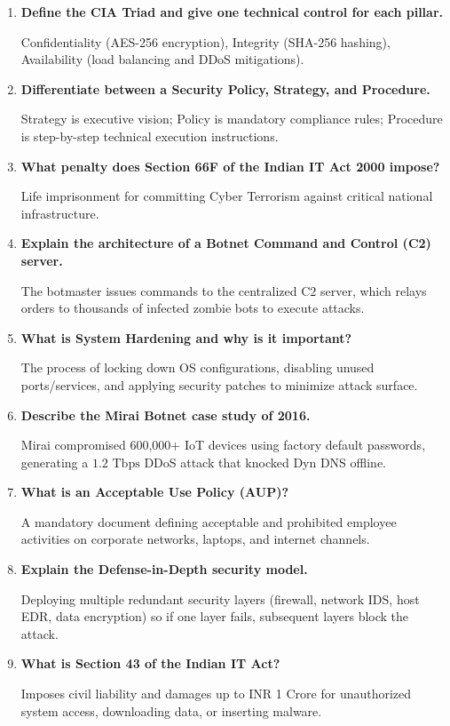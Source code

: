 \documentclass[12pt,a4paper]{article}
\newcommand{\Q}[1]{\textbf{#1}\par\noindent\ignorespaces}
\begin{document}
\begin{tcolorbox}[exambox, title={\textbf{Frequently Asked / Viva Questions}}]
\begin{enumerate}[leftmargin=*, label=\textbf{Q\arabic*.}, itemsep=5pt, topsep=0pt]
  \item \Q{Define the CIA Triad and give one technical control for each pillar.}
        Confidentiality (AES-256 encryption), Integrity (SHA-256 hashing), Availability (load balancing and DDoS mitigations).

  \item \Q{Differentiate between a Security Policy, Strategy, and Procedure.}
        Strategy is executive vision; Policy is mandatory compliance rules; Procedure is step-by-step technical execution instructions.

  \item \Q{What penalty does Section 66F of the Indian IT Act 2000 impose?}
        Life imprisonment for committing Cyber Terrorism against critical national infrastructure.

  \item \Q{Explain the architecture of a Botnet Command and Control (C2) server.}
        The botmaster issues commands to the centralized C2 server, which relays orders to thousands of infected zombie bots to execute attacks.

  \item \Q{What is System Hardening and why is it important?}
        The process of locking down OS configurations, disabling unused ports/services, and applying security patches to minimize attack surface.

  \item \Q{Describe the Mirai Botnet case study of 2016.}
        Mirai compromised 600,000+ IoT devices using factory default passwords, generating a $1.2\text{ Tbps}$ DDoS attack that knocked Dyn DNS offline.

  \item \Q{What is an Acceptable Use Policy (AUP)?}
        A mandatory document defining acceptable and prohibited employee activities on corporate networks, laptops, and internet channels.

  \item \Q{Explain the Defense-in-Depth security model.}
        Deploying multiple redundant security layers (firewall, network IDS, host EDR, data encryption) so if one layer fails, subsequent layers block the attack.

  \item \Q{What is Section 43 of the Indian IT Act?}
        Imposes civil liability and damages up to INR 1 Crore for unauthorized system access, downloading data, or inserting malware.


\end{enumerate}
\end{tcolorbox}
\end{document}

